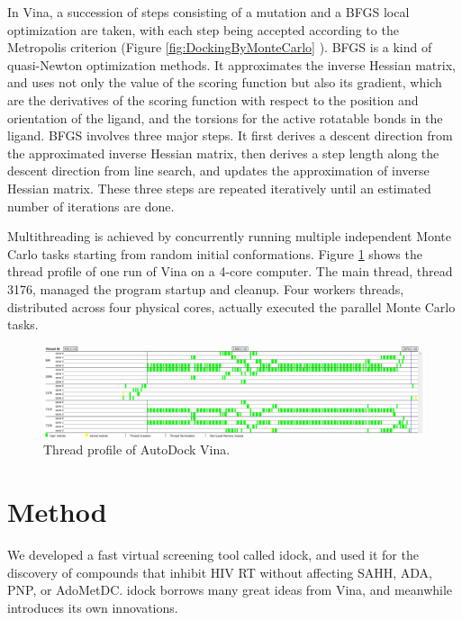 In Vina, a succession of steps consisting of a mutation and a BFGS local optimization are taken, with each step being accepted according to the Metropolis criterion (Figure \ref{fig:DockingByMonteCarlo} \citep{493-2008}). BFGS is a kind of quasi-Newton optimization methods. It approximates the inverse Hessian matrix, and uses not only the value of the scoring function but also its gradient, which are the derivatives of the scoring function with respect to the position and orientation of the ligand, and the torsions for the active rotatable bonds in the ligand. BFGS involves three major steps. It first derives a descent direction from the approximated inverse Hessian matrix, then derives a step length along the descent direction from line search, and updates the approximation of inverse Hessian matrix. These three steps are repeated iteratively until an estimated number of iterations are done.

Multithreading is achieved by concurrently running multiple independent Monte Carlo tasks starting from random initial conformations. Figure \ref{fig:VinaThreadProfile} shows the thread profile of one run of Vina on a 4-core computer. The main thread, thread 3176, managed the program startup and cleanup. Four workers threads, distributed across four physical cores, actually executed the parallel Monte Carlo tasks.

\begin{figure}
\centering
\includegraphics[width=\textwidth]{VirtualScreening/Figures/ThreadProfile.png}
\caption{Thread profile of AutoDock Vina.}
\label{fig:VinaThreadProfile}
\end{figure}

\section{Method}

We developed a fast virtual screening tool called idock, and used it for the discovery of compounds that inhibit HIV RT without affecting SAHH, ADA, PNP, or AdoMetDC. idock borrows many great ideas from Vina, and meanwhile introduces its own innovations.

